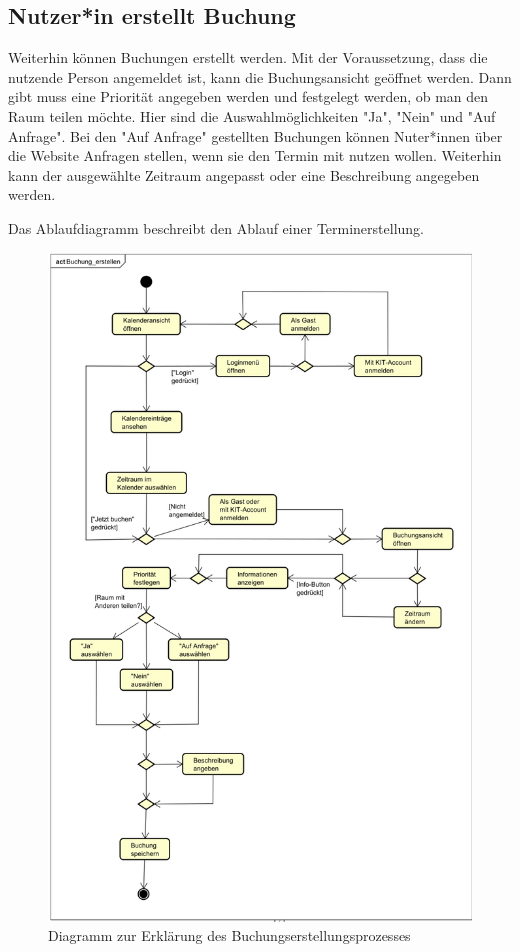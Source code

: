 \subsection{Nutzer*in erstellt Buchung}

 Weiterhin können Buchungen erstellt werden. Mit der Voraussetzung, dass die nutzende Person angemeldet ist,
kann die Buchungsansicht geöffnet werden. Dann gibt muss eine Priorität angegeben werden und festgelegt werden,
 ob man den Raum teilen möchte. Hier sind die Auswahlmöglichkeiten "Ja", "Nein" und "Auf Anfrage". Bei den "Auf
 Anfrage" gestellten Buchungen können Nuter*innen über die Website Anfragen stellen, wenn sie den Termin mit nutzen
 wollen. Weiterhin kann der ausgewählte Zeitraum angepasst oder eine Beschreibung angegeben werden.

 Das Ablaufdiagramm beschreibt den Ablauf einer Terminerstellung.

\begin{figure}[ht]
    \centering
    \includegraphics[width=\textwidth]{figures/activity/buchungerstellen}
    \caption{Diagramm zur Erklärung des Buchungserstellungsprozesses}
    \label{fig:make-booking-diagram}
\end{figure}

